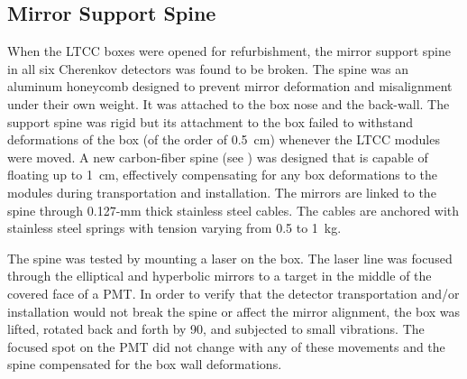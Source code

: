 \subsection{Mirror Support Spine}

When the LTCC boxes were opened for refurbishment, the mirror support spine in all six Cherenkov detectors was
found to be broken. The spine was an aluminum honeycomb designed to prevent mirror deformation and misalignment
under their own weight. It was attached to the box nose and the back-wall. The support spine was rigid but its
attachment to the box failed to withstand deformations of the box (of the order of 0.5~cm) whenever the LTCC
modules were moved. A new carbon-fiber spine (see ) was designed that is capable of floating up to 1~cm,
effectively compensating for any box deformations to the modules during transportation and installation. The
mirrors are linked to the spine through 0.127-mm thick stainless steel cables. The cables are anchored with stainless
steel springs with tension varying from 0.5 to 1~kg.

The spine was tested by mounting a laser on the box. The laser line was focused through the elliptical and hyperbolic
mirrors to a target in the middle of the covered face of a PMT. In order to verify that the detector transportation
and/or installation would not break the spine or affect the mirror alignment, the box was lifted, rotated back and
forth by 90\mdeg, and subjected to small vibrations. The focused spot on the PMT did not change with any of these
movements and the spine compensated for the box wall deformations.
